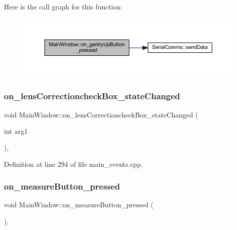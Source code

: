 Here is the call graph for this function\+:
\nopagebreak
\begin{figure}[H]
\begin{center}
\leavevmode
\includegraphics[width=350pt]{class_main_window_a6977641f537b731bb9ede0c341388fb1_cgraph}
\end{center}
\end{figure}
\mbox{\label{class_main_window_a67e14c051d3926ca57a97c271dcf7013}} 
\subsubsection{\texorpdfstring{on\_lensCorrectioncheckBox\_stateChanged}{on\_lensCorrectioncheckBox\_stateChanged}}
{\footnotesize\ttfamily void Main\+Window\+::on\+\_\+lens\+Correctioncheck\+Box\+\_\+state\+Changed (\begin{DoxyParamCaption}\item[{int}]{arg1 }\end{DoxyParamCaption})\hspace{0.3cm}{\ttfamily [private]}, {\ttfamily [slot]}}



Definition at line 294 of file main\+\_\+events.\+cpp.

\mbox{\label{class_main_window_aa9bd65042eb23d5fa3f548da285067a6}} 
\subsubsection{\texorpdfstring{on\_measureButton\_pressed}{on\_measureButton\_pressed}}
{\footnotesize\ttfamily void Main\+Window\+::on\+\_\+measure\+Button\+\_\+pressed (\begin{DoxyParamCaption}{ }\end{DoxyParamCaption})\hspace{0.3cm}{\ttfamily [private]}, {\ttfamily [slot]}}



